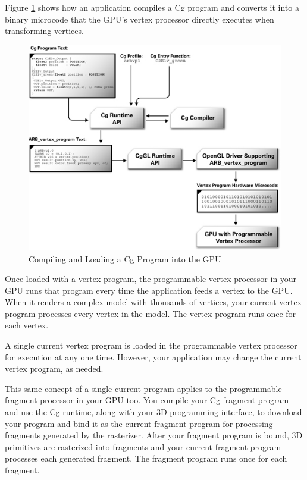 \documentclass{book}
\begin{document}
Figure \ref{fig:2-2} shows how an application compiles a Cg program and converts it into a binary microcode that the GPU's vertex processor directly executes when transforming vertices.

\begin{figure}
    \centering
    \includegraphics[width=1\linewidth]{Images/fig2_2.jpg}
    \caption{Compiling and Loading a Cg Program into the GPU}
    \label{fig:2-2}
\end{figure}

Once loaded with a vertex program, the programmable vertex processor in your GPU runs that program every time the application feeds a vertex to the GPU. When it renders a complex model with thousands of vertices, your current vertex program processes every vertex in the model. The vertex program runs once for each vertex.

A single current vertex program is loaded in the programmable vertex processor for execution at any one time. However, your application may change the current vertex program, as needed.

This same concept of a single current program applies to the programmable fragment processor in your GPU too. You compile your Cg fragment program and use the Cg runtime, along with your 3D programming interface, to download your program and bind it as the current fragment program for processing fragments generated by the rasterizer. After your fragment program is bound, 3D primitives are rasterized into fragments and your current fragment program processes each generated fragment. The fragment program runs once for each fragment.
\end{document}
